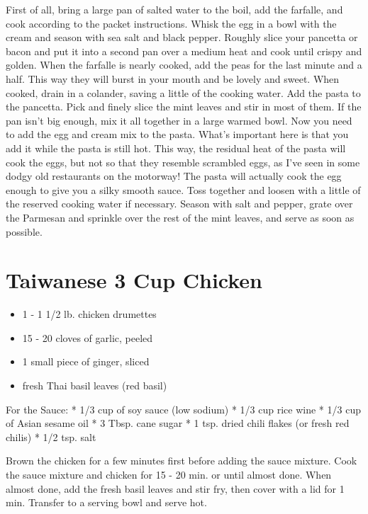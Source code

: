\documentclass[
]{book}
\providecommand{\tightlist}{%
  \setlength{\itemsep}{0pt}\setlength{\parskip}{0pt}}
\begin{document}
First of all, bring a large pan of salted water to the boil, add the farfalle, and cook according to the packet instructions.
Whisk the egg in a bowl with the cream and season with sea salt and black pepper.
Roughly slice your pancetta or bacon and put it into a second pan over a medium heat and cook until crispy and golden.
When the farfalle is nearly cooked, add the peas for the last minute and a half. This way they will burst in your mouth and be lovely and sweet. When cooked, drain in a colander, saving a little of the cooking water.
Add the pasta to the pancetta. Pick and finely slice the mint leaves and stir in most of them. If the pan isn't big enough, mix it all together in a large warmed bowl.
Now you need to add the egg and cream mix to the pasta. What's important here is that you add it while the pasta is still hot. This way, the residual heat of the pasta will cook the eggs, but not so that they resemble scrambled eggs, as I've seen in some dodgy old restaurants on the motorway! The pasta will actually cook the egg enough to give you a silky smooth sauce. Toss together and loosen with a little of the reserved cooking water if necessary.
Season with salt and pepper, grate over the Parmesan and sprinkle over the rest of the mint leaves, and serve as soon as possible.

\hypertarget{taiwanese-3-cup-chicken}{%
\section{Taiwanese 3 Cup Chicken}\label{taiwanese-3-cup-chicken}}

\begin{itemize}
\tightlist
\item
  1 - 1 1/2 lb. chicken drumettes
\item
  15 - 20 cloves of garlic, peeled
\item
  1 small piece of ginger, sliced
\item
  fresh Thai basil leaves (red basil)
\end{itemize}

For the Sauce:
* 1/3 cup of soy sauce (low sodium)
* 1/3 cup rice wine
* 1/3 cup of Asian sesame oil
* 3 Tbsp. cane sugar
* 1 tsp. dried chili flakes (or fresh red chilis)
* 1/2 tsp. salt

Brown the chicken for a few minutes first before adding the sauce mixture.
Cook the sauce mixture and chicken for 15 - 20 min. or until almost done.
When almost done, add the fresh basil leaves and stir fry, then cover with a lid for 1 min.
Transfer to a serving bowl and serve hot.
\end{document}
